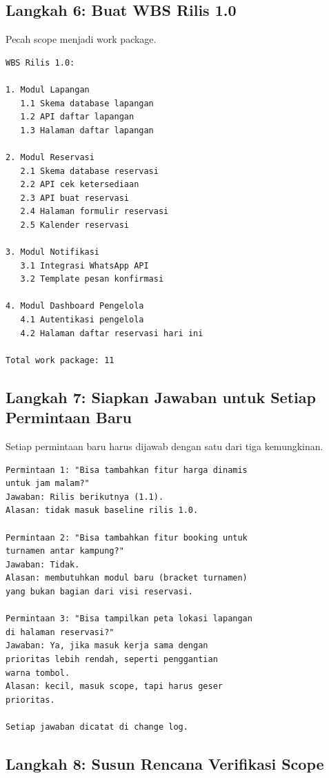 \documentclass[11pt,a4paper]{article}
\begin{document}
\subsection{Langkah 6: Buat WBS Rilis 1.0}

Pecah scope menjadi work package.

\begin{lstlisting}[style=out]
WBS Rilis 1.0:

1. Modul Lapangan
   1.1 Skema database lapangan
   1.2 API daftar lapangan
   1.3 Halaman daftar lapangan

2. Modul Reservasi
   2.1 Skema database reservasi
   2.2 API cek ketersediaan
   2.3 API buat reservasi
   2.4 Halaman formulir reservasi
   2.5 Kalender reservasi

3. Modul Notifikasi
   3.1 Integrasi WhatsApp API
   3.2 Template pesan konfirmasi

4. Modul Dashboard Pengelola
   4.1 Autentikasi pengelola
   4.2 Halaman daftar reservasi hari ini

Total work package: 11
\end{lstlisting}

\subsection{Langkah 7: Siapkan Jawaban untuk Setiap Permintaan Baru}

Setiap permintaan baru harus dijawab dengan satu dari tiga kemungkinan.

\begin{lstlisting}[style=out]
Permintaan 1: "Bisa tambahkan fitur harga dinamis
untuk jam malam?"
Jawaban: Rilis berikutnya (1.1).
Alasan: tidak masuk baseline rilis 1.0.

Permintaan 2: "Bisa tambahkan fitur booking untuk
turnamen antar kampung?"
Jawaban: Tidak.
Alasan: membutuhkan modul baru (bracket turnamen)
yang bukan bagian dari visi reservasi.

Permintaan 3: "Bisa tampilkan peta lokasi lapangan
di halaman reservasi?"
Jawaban: Ya, jika masuk kerja sama dengan
prioritas lebih rendah, seperti penggantian
warna tombol.
Alasan: kecil, masuk scope, tapi harus geser
prioritas.

Setiap jawaban dicatat di change log.
\end{lstlisting}

\subsection{Langkah 8: Susun Rencana Verifikasi Scope}
\end{document}
